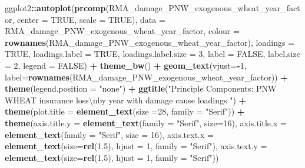\documentclass[]{article}
\newenvironment{Shaded}{\begin{snugshade}}{\end{snugshade}}
\newcommand{\CharTok}[1]{\textcolor[rgb]{0.31,0.60,0.02}{#1}}
\newcommand{\DataTypeTok}[1]{\textcolor[rgb]{0.13,0.29,0.53}{#1}}
\newcommand{\DecValTok}[1]{\textcolor[rgb]{0.00,0.00,0.81}{#1}}
\newcommand{\FloatTok}[1]{\textcolor[rgb]{0.00,0.00,0.81}{#1}}
\newcommand{\KeywordTok}[1]{\textcolor[rgb]{0.13,0.29,0.53}{\textbf{#1}}}
\newcommand{\NormalTok}[1]{#1}
\newcommand{\OperatorTok}[1]{\textcolor[rgb]{0.81,0.36,0.00}{\textbf{#1}}}
\newcommand{\OtherTok}[1]{\textcolor[rgb]{0.56,0.35,0.01}{#1}}
\newcommand{\StringTok}[1]{\textcolor[rgb]{0.31,0.60,0.02}{#1}}
\begin{document}
\begin{Shaded}
\begin{Highlighting}[]
\NormalTok{ggplot2}\OperatorTok{::}\KeywordTok{autoplot}\NormalTok{(}\KeywordTok{prcomp}\NormalTok{(RMA_damage_PNW_exogenous_wheat_year_factor, }\DataTypeTok{center =} \OtherTok{TRUE}\NormalTok{, }\DataTypeTok{scale =} \OtherTok{TRUE}\NormalTok{),  }\DataTypeTok{data =}\NormalTok{ RMA_damage_PNW_exogenous_wheat_year_factor, }\DataTypeTok{colour =} \KeywordTok{rownames}\NormalTok{(RMA_damage_PNW_exogenous_wheat_year_factor), }\DataTypeTok{loadings =} \OtherTok{TRUE}\NormalTok{, }\DataTypeTok{loadings.label =} \OtherTok{TRUE}\NormalTok{, }\DataTypeTok{loadings.label.size  =} \DecValTok{3}\NormalTok{, }\DataTypeTok{label =} \OtherTok{FALSE}\NormalTok{, }\DataTypeTok{label.size =} \DecValTok{2}\NormalTok{, }\DataTypeTok{legend =} \OtherTok{FALSE}\NormalTok{)  }\OperatorTok{+}\StringTok{ }\KeywordTok{theme_bw}\NormalTok{()   }\OperatorTok{+}\StringTok{ }\KeywordTok{geom_text}\NormalTok{(}\DataTypeTok{vjust=}\OperatorTok{-}\DecValTok{1}\NormalTok{, }\DataTypeTok{label=}\KeywordTok{rownames}\NormalTok{(RMA_damage_PNW_exogenous_wheat_year_factor)) }\OperatorTok{+}\StringTok{ }\KeywordTok{theme}\NormalTok{(}\DataTypeTok{legend.position =} \StringTok{"none"}\NormalTok{) }\OperatorTok{+}\StringTok{ }\KeywordTok{ggtitle}\NormalTok{(}\StringTok{"Principle Components: PNW WHEAT insurance loss}\CharTok{\textbackslash{}n}\StringTok{by year with damage cause loadings "}\NormalTok{) }\OperatorTok{+}\StringTok{ }\KeywordTok{theme}\NormalTok{(}\DataTypeTok{plot.title =} \KeywordTok{element_text}\NormalTok{(}\DataTypeTok{size =}\DecValTok{28}\NormalTok{, }\DataTypeTok{family =} \StringTok{"Serif"}\NormalTok{)) }\OperatorTok{+}\StringTok{ }\KeywordTok{theme}\NormalTok{(}\DataTypeTok{axis.title.y =} \KeywordTok{element_text}\NormalTok{(}\DataTypeTok{family =} \StringTok{"Serif"}\NormalTok{, }\DataTypeTok{size=}\DecValTok{16}\NormalTok{), }\DataTypeTok{axis.title.x =} \KeywordTok{element_text}\NormalTok{(}\DataTypeTok{family =} \StringTok{"Serif"}\NormalTok{, }\DataTypeTok{size =} \DecValTok{16}\NormalTok{), }\DataTypeTok{axis.text.x =} \KeywordTok{element_text}\NormalTok{(}\DataTypeTok{size=}\KeywordTok{rel}\NormalTok{(}\FloatTok{1.5}\NormalTok{), }\DataTypeTok{hjust =} \DecValTok{1}\NormalTok{, }\DataTypeTok{family =} \StringTok{"Serif"}\NormalTok{), }\DataTypeTok{axis.text.y =} \KeywordTok{element_text}\NormalTok{(}\DataTypeTok{size=}\KeywordTok{rel}\NormalTok{(}\FloatTok{1.5}\NormalTok{), }\DataTypeTok{hjust =} \DecValTok{1}\NormalTok{, }\DataTypeTok{family =} \StringTok{"Serif"}\NormalTok{))}
\end{Highlighting}
\end{Shaded}
\end{document}
